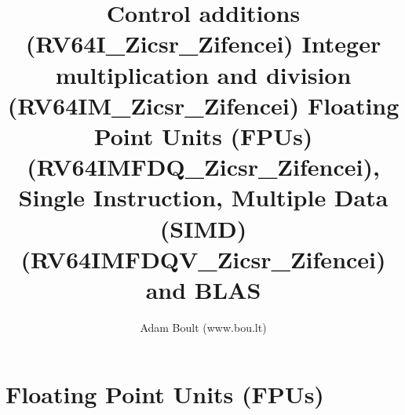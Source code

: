 \documentclass[oneside]{book}
\begin{document}
\author{Adam Boult (www.bou.lt)}
\title{Control additions (RV64I\_Zicsr\_Zifencei) Integer multiplication and division (RV64IM\_Zicsr\_Zifencei) Floating Point Units (FPUs) (RV64IMFDQ\_Zicsr\_Zifencei), Single Instruction, Multiple Data (SIMD) (RV64IMFDQV\_Zicsr\_Zifencei) and BLAS}
\maketitle

\setcounter{tocdepth}{0}
\tableofcontents



\part{Floating Point Units (FPUs)}
\end{document}
